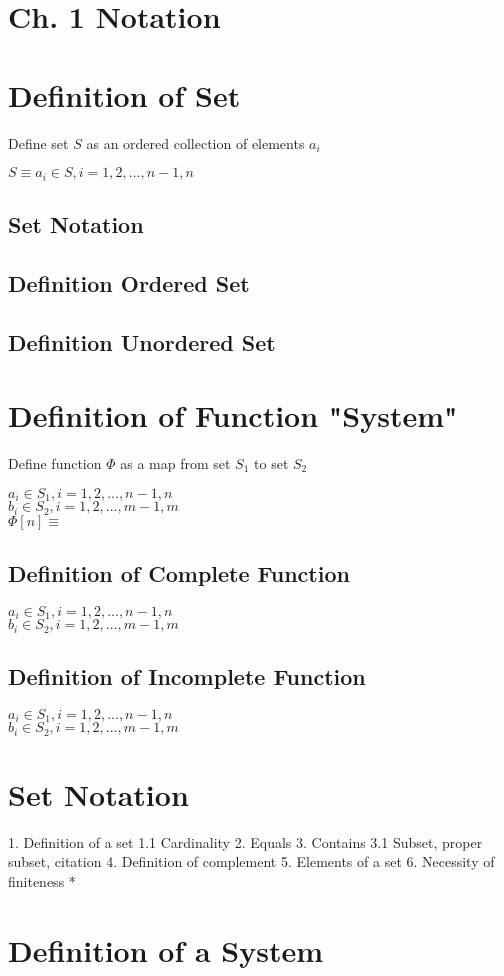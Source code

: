 \documentclass[11pt]{article}
\begin{document}
\section*{Ch. 1 Notation}

\section{Definition of Set}
Define set $S$ as an ordered collection of elements $a_i$

\begin{center}
$
S \equiv a_i \in  S,  i=1,2,...,n-1,n
$
\end{center}

\subsection{Set Notation}

\subsection{Definition Ordered Set}

\subsection{Definition Unordered Set}

\section{Definition of Function "System"}
Define function $\Phi$ as a map from set $S_1$ to set $S_2$
\begin{center}
$a_i \in  S_1,  i=1,2,...,n-1,n$\\
$b_i \in  S_2,  i=1,2,...,m-1,m$\\
$\Phi[n] \equiv $

\end{center}

\subsection{Definition of Complete Function}
\begin{center}
$a_i \in  S_1,  i=1,2,...,n-1,n$\\
$b_i \in  S_2,  i=1,2,...,m-1,m$\\
\end{center}



\subsection{Definition of Incomplete Function}
\begin{center}
$a_i \in  S_1,  i=1,2,...,n-1,n$\\
$b_i \in  S_2,  i=1,2,...,m-1,m$\\
\end{center}

\section{Set Notation}
1. Definition of a set
1.1 Cardinality
2. Equals
3. Contains
3.1 Subset, proper subset, citation
4. Definition of complement
5. Elements of a set
6. Necessity of finiteness *

\section{Definition of a System}
\end{document}
